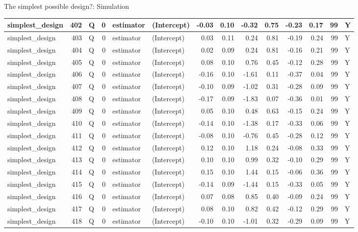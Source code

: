 \documentclass[
  11pt,
  ignorenonframetext,
]{beamer}
\begin{document}
\begin{frame}[fragile]{The simplest possible design?: Simulation}
\begin{tabular}{l|r|l|r|l|l|r|r|r|r|r|r|r|l}
\hline
simplest\_design & 402 & Q & 0 & estimator & (Intercept) & -0.03 & 0.10 & -0.32 & 0.75 & -0.23 & 0.17 & 99 & Y\\
\hline
simplest\_design & 403 & Q & 0 & estimator & (Intercept) & 0.03 & 0.11 & 0.24 & 0.81 & -0.19 & 0.24 & 99 & Y\\
\hline
simplest\_design & 404 & Q & 0 & estimator & (Intercept) & 0.02 & 0.09 & 0.24 & 0.81 & -0.16 & 0.21 & 99 & Y\\
\hline
simplest\_design & 405 & Q & 0 & estimator & (Intercept) & 0.08 & 0.10 & 0.76 & 0.45 & -0.12 & 0.28 & 99 & Y\\
\hline
simplest\_design & 406 & Q & 0 & estimator & (Intercept) & -0.16 & 0.10 & -1.61 & 0.11 & -0.37 & 0.04 & 99 & Y\\
\hline
simplest\_design & 407 & Q & 0 & estimator & (Intercept) & -0.10 & 0.09 & -1.02 & 0.31 & -0.28 & 0.09 & 99 & Y\\
\hline
simplest\_design & 408 & Q & 0 & estimator & (Intercept) & -0.17 & 0.09 & -1.83 & 0.07 & -0.36 & 0.01 & 99 & Y\\
\hline
simplest\_design & 409 & Q & 0 & estimator & (Intercept) & 0.05 & 0.10 & 0.48 & 0.63 & -0.15 & 0.24 & 99 & Y\\
\hline
simplest\_design & 410 & Q & 0 & estimator & (Intercept) & -0.14 & 0.10 & -1.38 & 0.17 & -0.33 & 0.06 & 99 & Y\\
\hline
simplest\_design & 411 & Q & 0 & estimator & (Intercept) & -0.08 & 0.10 & -0.76 & 0.45 & -0.28 & 0.12 & 99 & Y\\
\hline
simplest\_design & 412 & Q & 0 & estimator & (Intercept) & 0.12 & 0.10 & 1.18 & 0.24 & -0.08 & 0.33 & 99 & Y\\
\hline
simplest\_design & 413 & Q & 0 & estimator & (Intercept) & 0.10 & 0.10 & 0.99 & 0.32 & -0.10 & 0.29 & 99 & Y\\
\hline
simplest\_design & 414 & Q & 0 & estimator & (Intercept) & 0.15 & 0.10 & 1.44 & 0.15 & -0.06 & 0.36 & 99 & Y\\
\hline
simplest\_design & 415 & Q & 0 & estimator & (Intercept) & -0.14 & 0.09 & -1.44 & 0.15 & -0.33 & 0.05 & 99 & Y\\
\hline
simplest\_design & 416 & Q & 0 & estimator & (Intercept) & 0.07 & 0.08 & 0.85 & 0.40 & -0.09 & 0.24 & 99 & Y\\
\hline
simplest\_design & 417 & Q & 0 & estimator & (Intercept) & 0.08 & 0.10 & 0.82 & 0.42 & -0.12 & 0.29 & 99 & Y\\
\hline
simplest\_design & 418 & Q & 0 & estimator & (Intercept) & -0.10 & 0.10 & -1.01 & 0.32 & -0.29 & 0.09 & 99 & Y\\

\end{tabular}
\end{frame}
\end{document}
